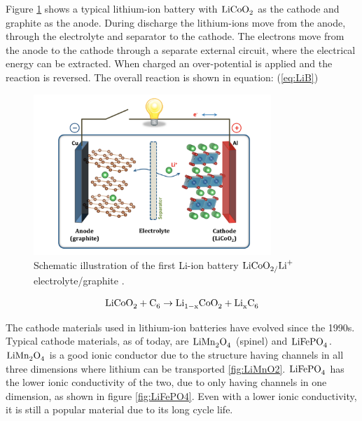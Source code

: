 Figure \ref{fig:LiCoO2} shows a typical lithium-ion battery with $\ce{LiCoO_2}$ as the cathode and graphite as the anode. During discharge the lithium-ions move from the anode, through the electrolyte and separator to the cathode. The electrons move from the anode to the cathode through a separate external circuit, where the electrical energy can be extracted. When charged an over-potential is applied and the reaction is reversed. The overall reaction is shown in equation: (\ref{eq:LiB})

\begin{figure}[H]
    \centering
    \includegraphics[width=0.8\textwidth]{Li-ion_inter.png}
    \caption{Schematic illustration of the first Li-ion battery $\ce{LiCoO_2/Li^+}$ electrolyte/graphite \cite{goodenough2013li}.}
    \label{fig:LiCoO2}
\end{figure}

\begin{align}\label{eq:LiB}
\ce{LiCoO_2} + \ce{C_6} \rightarrow \ce{Li_{1-x}CoO_2} + \ce{Li_xC_6}
\end{align}

The cathode materials used in lithium-ion batteries have evolved since the 1990s. Typical cathode materials, as of today, are $\ce{LiMn_2O_4}$ (spinel) and $\ce{LiFePO_4}$. $\ce{LiMn_2O_4}$ is a good ionic conductor due to the structure having channels in all three dimensions where lithium can be transported \ref{fig:LiMnO2}. $\ce{LiFePO_4}$ has the lower ionic conductivity of the two, due to only having channels in one dimension, as shown in figure \ref{fig:LiFePO4}. Even with a lower ionic conductivity, it is still a popular material due to its long cycle life.

